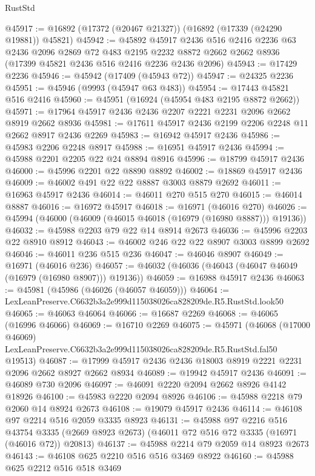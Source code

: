 \begin{lexlean}{RustStd}
\begin{coremodule}
@45917 := @16892 (@17372 (@20467 @21327)) (@16892 (@17339 (@24290 @19881)) @45821)
@45942 := @45892
    @45917
    @2436
    @516
    @2416
    @2236
    @63
    @2436
    @2096
    @2869
    @72
    @483
    @2195
    @2232
    @8872
    @2662
    @2662
    @8936
    (@17399 @45821 @2436 @516 @2416 @2236 @2436 @2096)
@45943 := @17429 @2236
@45946 := @45942 (@17409 (@45943 @72))
@45947 := @24325 @2236
@45951 := @45946 (@9993 (@45947 @63 @483))
@45954 := @17443 @45821 @516 @2416
@45960 := @45951 (@16924 (@45954 @483 @2195 @8872 @2662))
@45971 := @17964 @45917 @2436 @2436 @2207 @2221 @2231 @2096 @2662 @8919 @2662 @8936
@45981 := @17611 @45917 @2436 @2199 @2206 @2248 @11 @2662 @8917 @2436 @2269
@45983 := @16942 @45917 @2436
@45986 := @45983 @2206 @2248 @8917
@45988 := @16951 @45917 @2436
@45994 := @45988 @2201 @2205 @22 @24 @8894 @8916
@45996 := @18799 @45917 @2436
@46000 := @45996 @2201 @22 @8890 @8892
@46002 := @18869 @45917 @2436
@46009 := @46002 @491 @22 @22 @8887 @3003 @8879 @2692
@46011 := @16963 @45917 @2436
@46014 := @46011 @270 @515 @270
@46015 := @46014 @8887
@46016 := @16972 @45917
@46018 := @16971 (@46016 @270)
@46026 := @45994 (@46000 (@46009 (@46015 @46018 (@16979 (@16980 @8887))) @19136))
@46032 := @45988 @2203 @79 @22 @14 @8914 @2673
@46036 := @45996 @2203 @22 @8910 @8912
@46043 := @46002 @246 @22 @22 @8907 @3003 @8899 @2692
@46046 := @46011 @236 @515 @236
@46047 := @46046 @8907
@46049 := @16971 (@46016 @236)
@46057 := @46032 (@46036 (@46043 (@46047 @46049 (@16979 (@16980 @8907))) @19136))
@46059 := @16988 @45917 @2436
@46063 := @45981 (@45986 (@46026 (@46057 @46059)))
@46064 := LexLeanPreserve.C6632b3a2e999d115038026ca828209de.R5.RustStd.look50
@46065 := @46063 @46064
@46066 := @16687 @2269
@46068 := @46065 (@16996 @46066)
@46069 := @16710 @2269
@46075 := @45971
    (@46068
      (@17000 @46069)
      LexLeanPreserve.C6632b3a2e999d115038026ca828209de.R5.RustStd.fal50
      @19513)
@46087 := @17999 @45917 @2436 @2436 @18003 @8919 @2221 @2231 @2096 @2662 @8927 @2662 @8934
@46089 := @19942 @45917 @2436
@46091 := @46089 @730 @2096
@46097 := @46091 @2220 @2094 @2662 @8926 @4142 @18926
@46100 := @45983 @2220 @2094 @8926
@46106 := @45988 @2218 @79 @2060 @14 @8924 @2673
@46108 := @19079 @45917 @2436
@46114 := @46108 @97 @2214 @516 @2059 @3335 @8923
@46131 := @45988
    @97
    @2216
    @516
    @43754
    @3335
    (@2669 @8923 @2673)
    (@46011 @72 @516 @72 @3335 (@16971 (@46016 @72)) @20813)
@46137 := @45988 @2214 @79 @2059 @14 @8923 @2673
@46143 := @46108 @625 @2210 @516 @516 @3469 @8922
@46160 := @45988
    @625
    @2212
    @516
    @518
    @3469

\end{coremodule}
\end{lexlean}
